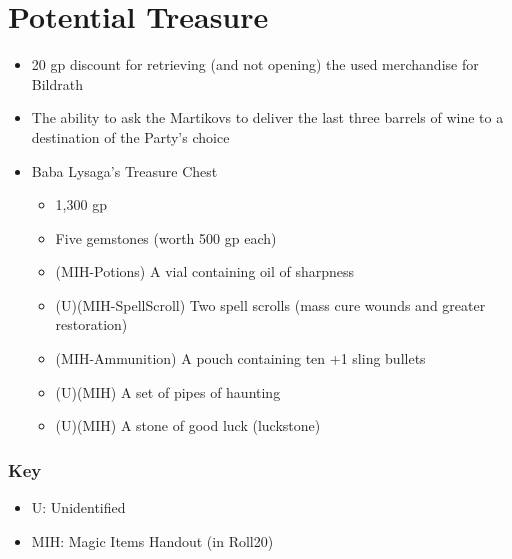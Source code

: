 \documentclass[a4paper,11pt]{article}
\begin{document}
\section{Potential Treasure}
\label{sec:PotentialTreasure}
\begin{itemize}
  \item 20 gp discount for retrieving (and not opening) the used merchandise for Bildrath
  \item The ability to ask the Martikovs to deliver the last three barrels of wine to a destination of the 
  Party's choice
  \item Baba Lysaga's Treasure Chest
  \begin{itemize}
    \item 1,300 gp
    \item Five gemstones (worth 500 gp each)
    \item (MIH-Potions) A vial containing oil of sharpness
    \item (U)(MIH-SpellScroll) Two spell scrolls (mass cure wounds and greater restoration)
    \item (MIH-Ammunition) A pouch containing ten +1 sling bullets
    \item (U)(MIH) A set of pipes of haunting
    \item (U)(MIH) A stone of good luck (luckstone)
  \end{itemize}
\end{itemize}
\subsubsection*{Key}
\begin{itemize}
    \item U: Unidentified
    \item MIH: Magic Items Handout (in Roll20)
\end{itemize}
\end{document}
